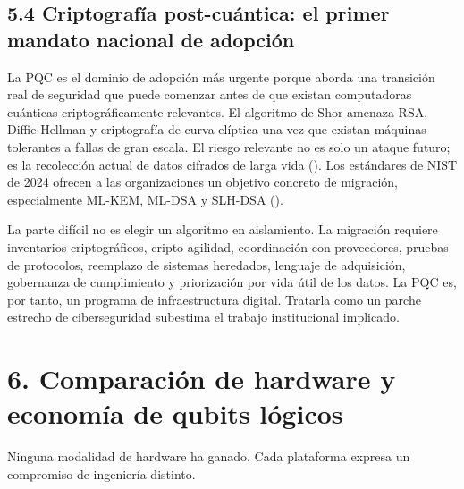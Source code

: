 \documentclass[
  11pt,
  letterpaper,
]{article}
\begin{document}
\subsection{5.4 Criptografía post-cuántica: el primer mandato nacional
de
adopción}\label{criptografuxeda-post-cuuxe1ntica-el-primer-mandato-nacional-de-adopciuxf3n}

La PQC es el dominio de adopción más urgente porque aborda una
transición real de seguridad que puede comenzar antes de que existan
computadoras cuánticas criptográficamente relevantes. El algoritmo de
Shor amenaza RSA, Diffie-Hellman y criptografía de curva elíptica una
vez que existan máquinas tolerantes a fallas de gran escala. El riesgo
relevante no es solo un ataque futuro; es la recolección actual de datos
cifrados de larga vida (). Los
estándares de NIST de 2024 ofrecen a las organizaciones un objetivo
concreto de migración, especialmente ML-KEM, ML-DSA y SLH-DSA
().

La parte difícil no es elegir un algoritmo en aislamiento. La migración
requiere inventarios criptográficos, cripto-agilidad, coordinación con
proveedores, pruebas de protocolos, reemplazo de sistemas heredados,
lenguaje de adquisición, gobernanza de cumplimiento y priorización por
vida útil de los datos. La PQC es, por tanto, un programa de
infraestructura digital. Tratarla como un parche estrecho de
ciberseguridad subestima el trabajo institucional implicado.

\section{6. Comparación de hardware y economía de qubits
lógicos}\label{comparaciuxf3n-de-hardware-y-economuxeda-de-qubits-luxf3gicos}

Ninguna modalidad de hardware ha ganado. Cada plataforma expresa un
compromiso de ingeniería distinto.
\end{document}
